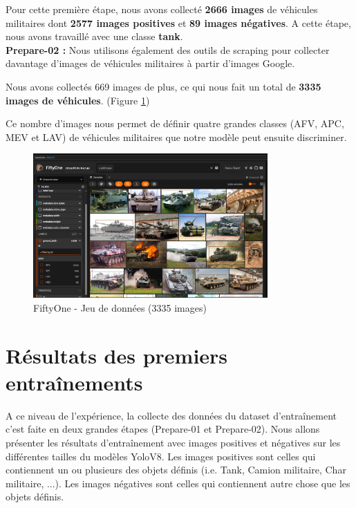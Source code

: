 \noindent Pour cette première étape, nous avons collecté \textbf{2666 images} de véhicules militaires dont \textbf{2577 images positives} et \textbf{89 images négatives}.
A cette étape, nous avons travaillé avec une classe \textbf{tank}.\\


\textbf{Prepare-02 :} Nous utilisons également des outils de scraping pour collecter davantage d'images de véhicules militaires à partir d'images Google.

\noindent Nous avons collectés 669 images de plus, ce qui nous fait un total de \textbf{3335 images de véhicules}. (Figure \ref{fig:fiftyone-dataset})

Ce nombre d'images nous permet de définir quatre grandes classes (AFV, APC, MEV et LAV) de véhicules militaires que notre modèle peut ensuite discriminer.


\begin{figure}[H]
    \center
    \includegraphics[width=0.8\textwidth]{./images/fiftyone-dataset.png}
    \caption[Fiftyone dataset]{FiftyOne - Jeu de données (3335 images)}\label{fig:fiftyone-dataset}
\end{figure}


\section{Résultats des premiers entraînements}

A ce niveau de l'expérience, la collecte des données du dataset d'entraînement c'est faite en deux grandes étapes (Prepare-01 et Prepare-02).
Nous allons présenter les résultats d'entraînement avec images positives et négatives sur les différentes tailles du modèles YoloV8.
Les images positives sont celles qui contiennent un ou plusieurs des objets définis (i.e. Tank, Camion militaire, Char militaire, ...).
Les images négatives sont celles qui contiennent autre chose que les objets définis.\\

